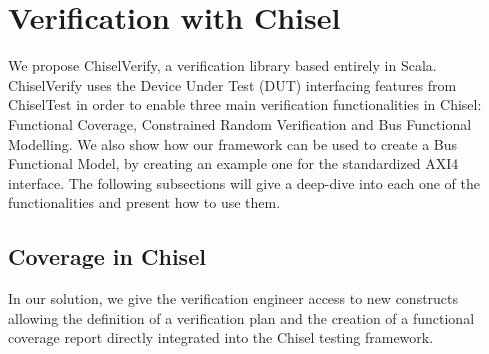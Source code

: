 \documentclass[conference]{IEEEtran}
\newcommand{\todo}[1]{{\color{olive} TODO: #1}}
\newcommand{\martin}[1]{{\color{blue} Martin: #1}}
\begin{document}
\section{Verification with Chisel}

We propose ChiselVerify, a verification library based entirely in Scala. ChiselVerify uses the Device Under Test (DUT) interfacing features from ChiselTest in order to enable three main verification functionalities in Chisel: Functional Coverage, Constrained Random Verification and Bus Functional Modelling. We also show how our framework can be used to create a Bus Functional Model, by creating an example one for the standardized AXI4 interface. The following subsections will give a deep-dive into each one of the functionalities and present how to use them.

\subsection{Coverage in Chisel}


In our solution, we give the verification engineer access to new constructs allowing the definition of a verification plan and the creation of a functional coverage report directly integrated into the Chisel testing framework.
\end{document}
